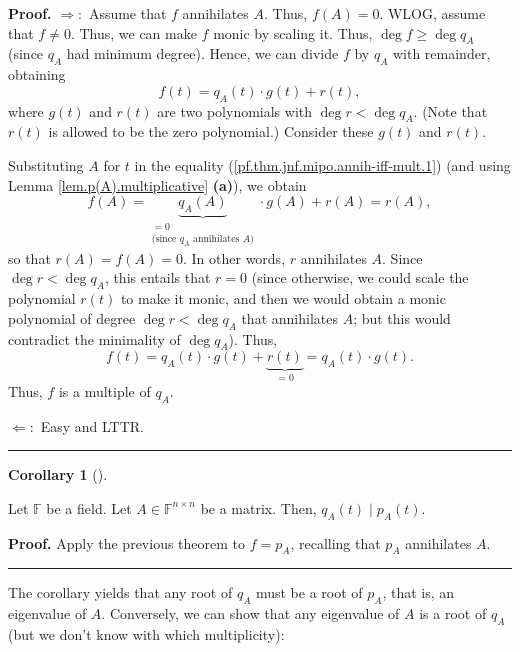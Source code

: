\documentclass[numbers=enddot,12pt,final,onecolumn,notitlepage]{scrartcl}%
\numberwithin{exer}{subsection}
\theoremstyle{definition}
\newtheorem{coro}[theo]{Corollary}
\newenvironment{corollary}[1][]
{\begin{coro}[#1]\begin{leftbar}}
{\end{leftbar}\end{coro}}
\newenvironment{proof}[1][Proof]{\noindent\textbf{#1.} }{\ \rule{0.5em}{0.5em}}
\begin{document}
\begin{proof}
$\Longrightarrow:$ Assume that $f$ annihilates $A$. Thus, $f\left(  A\right)
=0$. WLOG, assume that $f\neq0$. Thus, we can make $f$ monic by scaling it.
Thus, $\deg f\geq\deg q_{A}$ (since $q_{A}$ had minimum degree). Hence, we can
divide $f$ by $q_{A}$ with remainder, obtaining%
\begin{equation}
f\left(  t\right)  =q_{A}\left(  t\right)  \cdot g\left(  t\right)  +r\left(
t\right)  , \label{pf.thm.jnf.mipo.annih-iff-mult.1}%
\end{equation}
where $g\left(  t\right)  $ and $r\left(  t\right)  $ are two polynomials with
$\deg r<\deg q_{A}$. (Note that $r\left(  t\right)  $ is allowed to be the
zero polynomial.) Consider these $g\left(  t\right)  $ and $r\left(  t\right)
$.

Substituting $A$ for $t$ in the equality
(\ref{pf.thm.jnf.mipo.annih-iff-mult.1}) (and using Lemma
\ref{lem.p(A).multiplicative} \textbf{(a)}), we obtain%
\[
f\left(  A\right)  =\underbrace{q_{A}\left(  A\right)  }%
_{\substack{=0\\\text{(since }q_{A}\text{ annihilates }A\text{)}}}\cdot
g\left(  A\right)  +r\left(  A\right)  =r\left(  A\right)  ,
\]
so that $r\left(  A\right)  =f\left(  A\right)  =0$. In other words, $r$
annihilates $A$. Since $\deg r<\deg q_{A}$, this entails that $r=0$ (since
otherwise, we could scale the polynomial $r\left(  t\right)  $ to make it
monic, and then we would obtain a monic polynomial of degree $\deg r<\deg
q_{A}$ that annihilates $A$; but this would contradict the minimality of $\deg
q_{A}$). Thus,%
\[
f\left(  t\right)  =q_{A}\left(  t\right)  \cdot g\left(  t\right)
+\underbrace{r\left(  t\right)  }_{=0}=q_{A}\left(  t\right)  \cdot g\left(
t\right)  .
\]
Thus, $f$ is a multiple of $q_{A}$. \medskip

$\Longleftarrow:$ Easy and LTTR.
\end{proof}

\begin{corollary}
\label{cor.jnf.mipo.div-charpol}Let $\mathbb{F}$ be a field. Let
$A\in\mathbb{F}^{n\times n}$ be a matrix. Then, $q_{A}\left(  t\right)  \mid
p_{A}\left(  t\right)  $.
\end{corollary}

\begin{proof}
Apply the previous theorem to $f=p_{A}$, recalling that $p_{A}$ annihilates
$A$.
\end{proof}

The corollary yields that any root of $q_{A}$ must be a root of $p_{A}$, that
is, an eigenvalue of $A$. Conversely, we can show that any eigenvalue of $A$
is a root of $q_{A}$ (but we don't know with which multiplicity):
\end{document}
